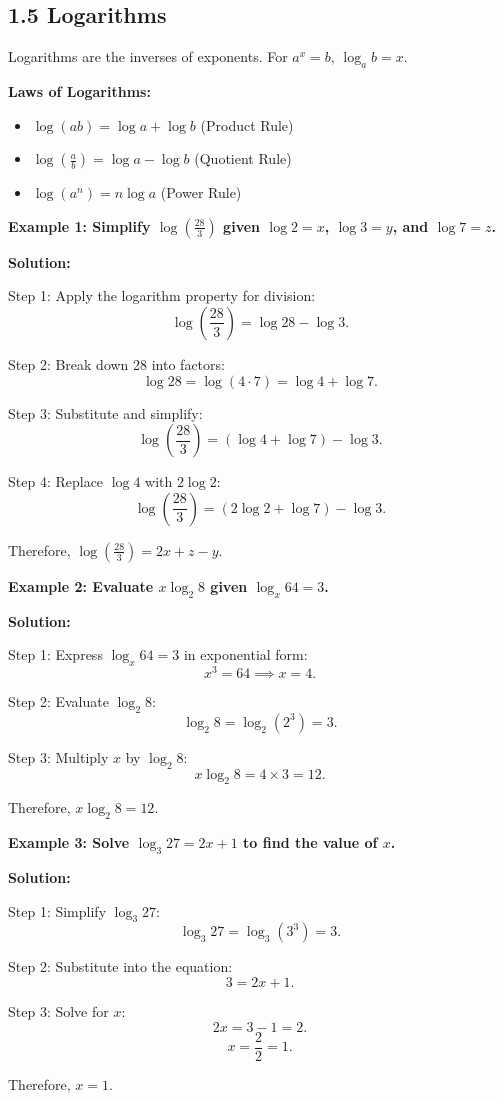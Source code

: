 
\subsection*{1.5 Logarithms}
Logarithms are the inverses of exponents. For $a^x = b$, $\log_a b = x$.

\textbf{Laws of Logarithms:}
\begin{itemize}
    \item $\log(ab) = \log a + \log b$ (Product Rule)
    \item $\log\left(\frac{a}{b}\right) = \log a - \log b$ (Quotient Rule)
    \item $\log(a^n) = n\log a$ (Power Rule)
\end{itemize}

\begin{flushleft}
\textbf{Example 1: Simplify $\log\left(\frac{28}{3}\right)$ given $\log 2 = x$, $\log 3 = y$, and $\log 7 = z$.}

\textbf{Solution:}

Step 1: Apply the logarithm property for division:
\[
\log\left(\frac{28}{3}\right) = \log 28 - \log 3.
\]

Step 2: Break down 28 into factors:
\[
\log 28 = \log(4 \cdot 7) = \log 4 + \log 7.
\]

Step 3: Substitute and simplify:
\[
\log\left(\frac{28}{3}\right) = (\log 4 + \log 7) - \log 3.
\]

Step 4: Replace $\log 4$ with $2\log 2$:
\[
\log\left(\frac{28}{3}\right) = (2\log 2 + \log 7) - \log 3.
\]

Therefore, $\log\left(\frac{28}{3}\right) = 2x + z - y$.
\end{flushleft}

\begin{flushleft}
\textbf{Example 2: Evaluate $x \log_2 8$ given $\log_x 64 = 3$.}

\textbf{Solution:}

Step 1: Express $\log_x 64 = 3$ in exponential form:
\[
x^3 = 64 \implies x = 4.
\]

Step 2: Evaluate $\log_2 8$:
\[
\log_2 8 = \log_2(2^3) = 3.
\]

Step 3: Multiply $x$ by $\log_2 8$:
\[
x \log_2 8 = 4 \times 3 = 12.
\]

Therefore, $x \log_2 8 = 12$.
\end{flushleft}

\begin{flushleft}
\textbf{Example 3: Solve $\log_3 27 = 2x + 1$ to find the value of $x$.}

\textbf{Solution:}

Step 1: Simplify $\log_3 27$:
\[
\log_3 27 = \log_3(3^3) = 3.
\]

Step 2: Substitute into the equation:
\[
3 = 2x + 1.
\]

Step 3: Solve for $x$:
\[
2x = 3 - 1 = 2.
\]
\[
x = \frac{2}{2} = 1.
\]

Therefore, $x = 1$.
\end{flushleft}


